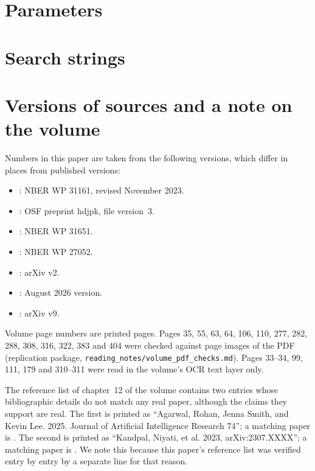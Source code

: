 \documentclass[12pt]{article}
\theoremstyle{remark}
\begin{document}
\section{Parameters}\label{app:params}


\section{Search strings}\label{app:search}


\section{Versions of sources and a note on the volume}\label{app:versions}\label{app:volume}
Numbers in this paper are taken from the following versions, which differ in places from published versions:
\begin{itemize}[itemsep=0pt]
\item \citet{brynjolfsson2025work}: NBER WP 31161, revised November 2023.
\item \citet{otis2026uneven}: OSF preprint hdjpk, file version~3.
\item \citet{dube2025policing}: NBER WP 31651.
\item \citet{acemoglu2020tax}: NBER WP 27052.
\item \citet{steyvers2025know}: arXiv v2.
\item \citet{brynjolfsson2025canaries}: August 2026 version.
\item \citet{ide2025automation}: arXiv v9.
\end{itemize}
Volume page numbers are printed pages. Pages 35, 55, 63, 64, 106, 110, 277, 282, 288, 308, 316, 322, 383 and 404 were checked against page images of the PDF (replication package, \texttt{reading\_notes/volume\_pdf\_checks.md}). Pages 33--34, 99, 111, 179 and 310--311 were read in the volume's OCR text layer only.

The reference list of chapter~12 of the volume contains two entries whose bibliographic details do not match any real paper, although the claims they support are real. The first is printed as ``Agarwal, Rohan, Jenna Smith, and Kevin Lee. 2025. Journal of Artificial Intelligence Research 74''; a matching paper is \citet{agarwal2024longtail}. The second is printed as ``Kandpal, Niyati, et al. 2023, arXiv:2307.XXXX''; a matching paper is \citet{kandpal2023longtail}. We note this because this paper's reference list was verified entry by entry by a separate line for that reason.
\end{document}
